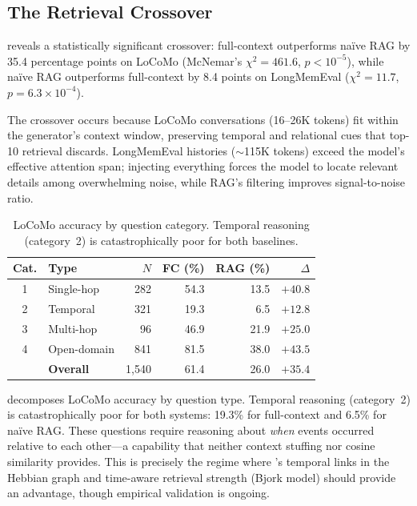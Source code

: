 \subsection{The Retrieval Crossover}

 reveals a statistically significant crossover: full-context
outperforms na\"ive RAG by 35.4 percentage points on LoCoMo (McNemar's
$\chi^2 = 461.6$, $p < 10^{-5}$), while na\"ive RAG outperforms
full-context by 8.4 points on LongMemEval ($\chi^2 = 11.7$,
$p = 6.3 \times 10^{-4}$).

The crossover occurs because LoCoMo conversations (16--26K tokens) fit
within the generator's context window, preserving temporal and relational
cues that top-10 retrieval discards. LongMemEval histories (${\sim}$115K
tokens) exceed the model's effective attention span; injecting everything
forces the model to locate relevant details among overwhelming noise, while
RAG's filtering improves signal-to-noise ratio.

\begin{table}[!t]
\centering
\caption{LoCoMo accuracy by question category. Temporal reasoning
(category~2) is catastrophically poor for both baselines.}
\label{tab:categories}
\small
\begin{tabular}{@{}clrrrr@{}}
\toprule
\textbf{Cat.} & \textbf{Type} & \textbf{$N$} & \textbf{FC (\%)} & \textbf{RAG (\%)} & \textbf{$\Delta$} \\
\midrule
1 & Single-hop     & 282 & 54.3 & 13.5 & $+40.8$ \\
2 & Temporal        & 321 & 19.3 &  6.5 & $+12.8$ \\
3 & Multi-hop       &  96 & 46.9 & 21.9 & $+25.0$ \\
4 & Open-domain     & 841 & 81.5 & 38.0 & $+43.5$ \\
\midrule
  & \textbf{Overall} & 1{,}540 & 61.4 & 26.0 & $+35.4$ \\
\bottomrule
\end{tabular}
\end{table}

 decomposes LoCoMo accuracy by question type. Temporal
reasoning (category~2) is catastrophically poor for both systems: 19.3\%
for full-context and 6.5\% for na\"ive RAG. These questions require
reasoning about \emph{when} events occurred relative to each other---a
capability that neither context stuffing nor cosine similarity provides.
This is precisely the regime where \alaya{}'s temporal links in the Hebbian
graph and time-aware retrieval strength (Bjork model) should provide an
advantage, though empirical validation is ongoing.

